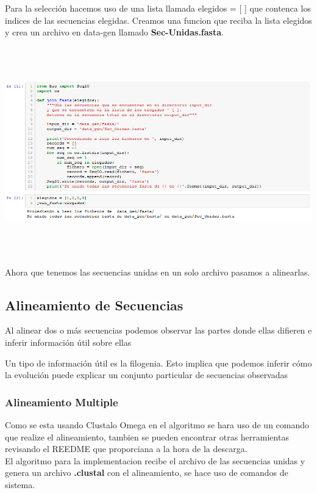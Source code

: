 \documentclass[a4paper]{article}
\begin{document}
\noindent Para la selección hacemos uso de una lista llamada elegidos = [  ] que contenca los indices de las secuencias elegidas. Creamos una funcion que reciba la lista elegidos y crea un archivo en data-gen llamado \textbf{Sec-Unidas.fasta}.

\begin{center}
	\includegraphics[width=16cm,height=9cm]{join_Fasta.png}
\end{center}

Ahora que tenemos las secuencias unidas en un solo archivo pasamos a alinearlas.

\subsection{Alineamiento de Secuencias}

\noindent Al alinear dos o más secuencias podemos observar las partes donde ellas difieren e inferir información útil sobre ellas


\noindent Un tipo de información útil es la filogenia. Esto implica que podemos inferir cómo la evolución puede explicar un conjunto particular de secuencias observadas


\subsubsection{Alineamiento Multiple}
Como se esta usando Clustalo Omega en el algoritmo se hara uso de un comando que realize el alineamiento, tambien se pueden encontrar otras herramientas revisando el REEDME que proporciana a la hora de la descarga.\\
  
\noindent El algoritmo para la implementacion recibe el archivo de las secuencias unidas y genera un archivo \textbf{.clustal} con el alineamiento, se hace uso de comandos de sistema. 
 
\end{document}
